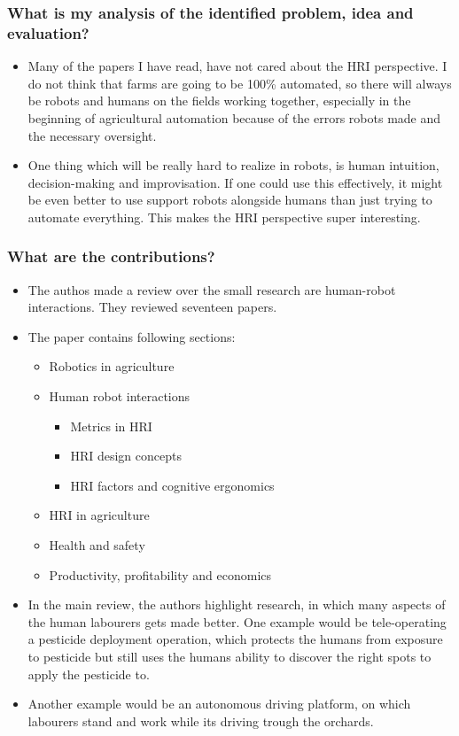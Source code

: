 \documentclass{article}
\begin{document}
\subsubsection*{What is my analysis of the identified problem, idea and evaluation?}
\begin{itemize}
    \item Many of the papers I have read, have not cared about the HRI perspective. I do not think that farms are going to be 100\% automated, so there will always be robots and humans on the fields working together, especially in the beginning of agricultural automation because of the errors robots made and the necessary oversight.
    \item One thing which will be really hard to realize in robots, is human intuition, decision-making and improvisation. If one could use this effectively, it might be even better to use support robots alongside humans than just trying to automate everything. This makes the HRI perspective super interesting.
\end{itemize}
\subsubsection*{What are the contributions?}
\begin{itemize}
    \item The authos made a review over the small research are human-robot interactions. They reviewed seventeen papers.
    \item The paper contains following sections: \ \begin{itemize}
        \item Robotics in agriculture
        \item Human robot interactions \ \begin{itemize}
            \item Metrics in HRI
            \item HRI design concepts
            \item HRI factors and cognitive ergonomics
        \end{itemize}
        \item HRI in agriculture
        \item Health and safety
        \item Productivity, profitability and economics
    \end{itemize}
    \item In the main review, the authors highlight research, in which many aspects of the human labourers gets made better. One example would be tele-operating a pesticide deployment operation, which protects the humans from exposure to pesticide but still uses the humans ability to discover the right spots to apply the pesticide to. 
    \item Another example would be an autonomous driving platform, on which labourers stand and work while its driving trough the orchards.
\end{itemize}
\end{document}
